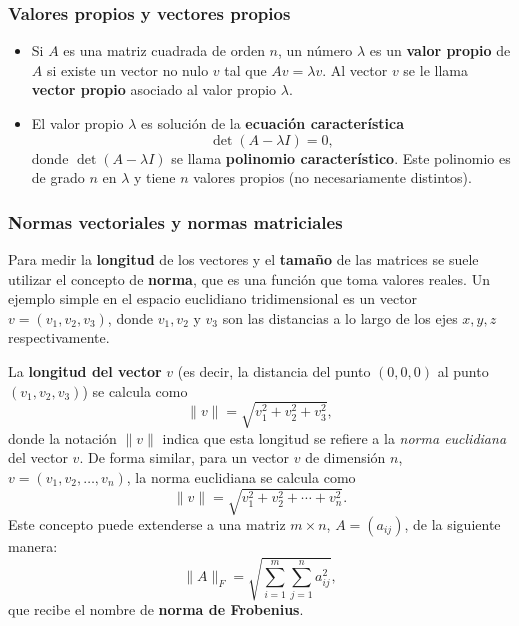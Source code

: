 \documentclass[12pt]{article}
\begin{document}
\subsubsection{Valores propios y vectores propios}

\begin{itemize}
\item Si $A$ es una matriz cuadrada de orden $n$, un número $\lambda$ es un \textbf{valor propio} de $A$ si existe un vector no nulo $v$ tal que $Av = \lambda v$. Al vector $v$ se le llama \textbf{vector propio} asociado al valor propio $\lambda$.

\item El valor propio $\lambda$ es solución de la \textbf{ecuación característica} $$\det(A - \lambda I) = 0,$$ donde $\det(A - \lambda I)$ se llama \textbf{polinomio característico}.  Este polinomio es de grado $n$ en $\lambda$  y tiene $n$ valores propios (no necesariamente distintos).
\end{itemize}

\subsubsection{Normas vectoriales y normas matriciales}
Para medir la \textbf{longitud} de los vectores y el \textbf{tamaño} de las matrices se suele utilizar el concepto de \textbf{norma}, que es una función que toma valores reales. Un ejemplo simple en el espacio euclidiano tridimensional es un vector $v = (v_1, v_2, v_3)$, donde $v_1, v_2$ y $v_3$ son las distancias a lo largo de los ejes $x, y, z$ respectivamente.  \bigskip

La \textbf{longitud del vector} $v$ (es decir, la distancia del punto $(0,0,0)$ al punto $(v_1, v_2, v_3)$) se calcula como $$\|v\| = \sqrt{v_1^2 + v_2^2 + v_3^2},$$
donde la notación $\|v\|$ indica que esta longitud se refiere a la \textit{norma euclidiana} del vector $v$.   De forma similar, para un vector $v$ de dimensión $n$, $v = (v_1, v_2, \ldots, v_n)$, la norma euclidiana se calcula como $$\|v\| = \sqrt{v_1^2 + v_2^2 + \cdots + v_n^2}.$$ Este concepto puede extenderse a una matriz $ m \times n $, $ A = (a_{ij}) $, de la siguiente manera: $$\|A\|_F = \sqrt{ \sum_{i=1}^m \sum_{j=1}^n a_{ij}^2 },$$
que recibe el nombre de \textbf{norma de Frobenius}.
\end{document}
